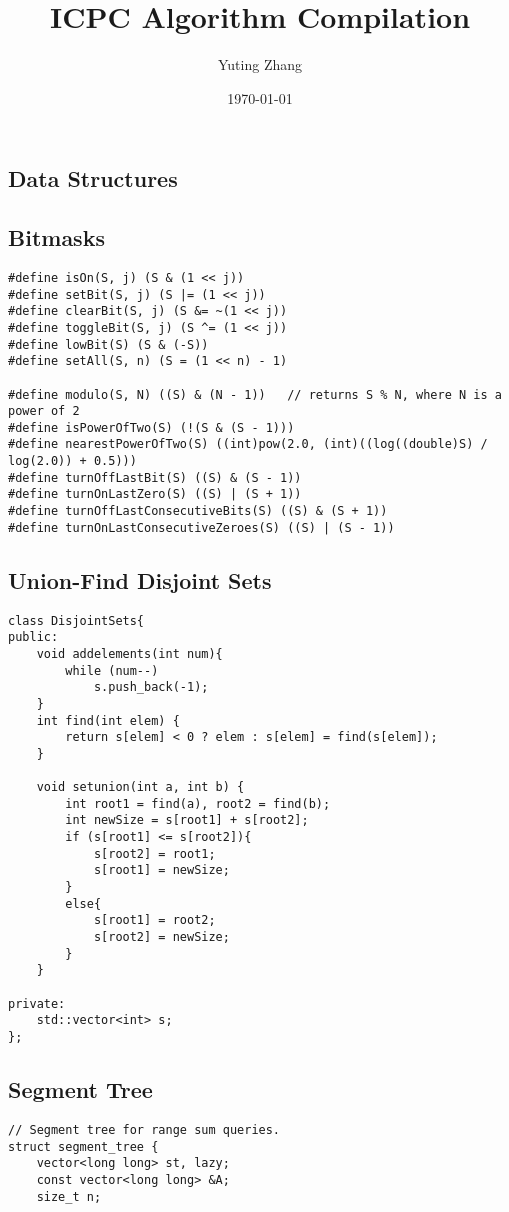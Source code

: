 \documentclass[10pt,landscape]{article}
\title{ICPC Algorithm Compilation}
\date{\today}
\author{Yuting Zhang}
\begin{document}
\begin{multicols}{2}
\maketitle
\thispagestyle{empty}
\newpage
\pagestyle{plain}
\tableofcontents
\setcounter{page}{1}
\newpage

\setcounter{page}{1}
\section{Data Structures}
\subsection{Bitmasks}
\begin{lstlisting}
#define isOn(S, j) (S & (1 << j))
#define setBit(S, j) (S |= (1 << j))
#define clearBit(S, j) (S &= ~(1 << j))
#define toggleBit(S, j) (S ^= (1 << j))
#define lowBit(S) (S & (-S))
#define setAll(S, n) (S = (1 << n) - 1)

#define modulo(S, N) ((S) & (N - 1))   // returns S % N, where N is a power of 2
#define isPowerOfTwo(S) (!(S & (S - 1)))
#define nearestPowerOfTwo(S) ((int)pow(2.0, (int)((log((double)S) / log(2.0)) + 0.5)))
#define turnOffLastBit(S) ((S) & (S - 1))
#define turnOnLastZero(S) ((S) | (S + 1))
#define turnOffLastConsecutiveBits(S) ((S) & (S + 1))
#define turnOnLastConsecutiveZeroes(S) ((S) | (S - 1))
\end{lstlisting}

\subsection{Union-Find Disjoint Sets}
\begin{lstlisting}
class DisjointSets{
public:
	void addelements(int num){
		while (num--)
			s.push_back(-1);
	}
	int find(int elem) {
		return s[elem] < 0 ? elem : s[elem] = find(s[elem]); 
	}

	void setunion(int a, int b) {
		int root1 = find(a), root2 = find(b);
		int newSize = s[root1] + s[root2];
		if (s[root1] <= s[root2]){
			s[root2] = root1;
			s[root1] = newSize;
		}
		else{
			s[root1] = root2;
			s[root2] = newSize;
		}
	}

private:
    std::vector<int> s;
};
\end{lstlisting}
\newpage

\subsection{Segment Tree}
\begin{lstlisting}
// Segment tree for range sum queries.
struct segment_tree {
    vector<long long> st, lazy;
    const vector<long long> &A;
    size_t n;


\end{lstlisting}
\end{multicols}
\end{document}
